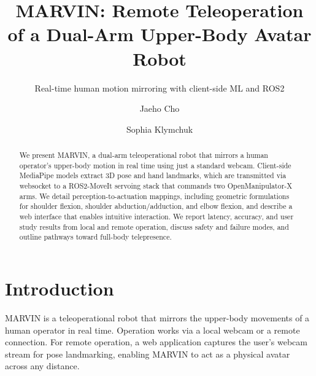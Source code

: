 \documentclass[sigconf]{acmart}
\begin{document}
\title{MARVIN: Remote Teleoperation of a Dual-Arm Upper-Body Avatar Robot}
\subtitle{Real-time human motion mirroring with client-side ML and ROS2}

\author{Jaeho Cho}
\author{Sophia Klymchuk}
\authornotemark[1]

\renewcommand{\shortauthors}{Last}

\begin{abstract}
We present MARVIN, a dual-arm teleoperational robot that mirrors a human operator's upper-body motion in real time using just a standard webcam. Client-side MediaPipe models extract 3D pose and hand landmarks, which are transmitted via websocket to a ROS2-MoveIt servoing stack that commands two OpenManipulator-X arms. We detail perception-to-actuation mappings, including geometric formulations for shoulder flexion, shoulder abduction/adduction, and elbow flexion, and describe a web interface that enables intuitive interaction. We report latency, accuracy, and user study results from local and remote operation, discuss safety and failure modes, and outline pathways toward full-body telepresence.
\end{abstract}




\maketitle

\section{Introduction}
MARVIN is a teleoperational robot that mirrors the upper-body movements of a human operator in real time. Operation works via a local webcam or a remote connection. For remote operation, a web application captures the user's webcam stream for pose landmarking, enabling MARVIN to act as a physical avatar across any distance.
\end{document}
